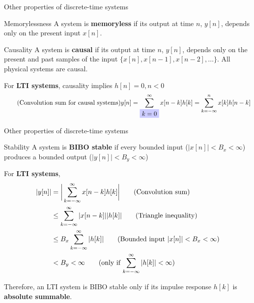 \documentclass[10pt, aspectratio=169]{beamer}
\begin{document}
\begin{frame}{Other properties of discrete-time systems}

\begin{block}{Memorylessness}
	A system is \textbf{memoryless} if its output at time $n$, $y[n]$,  depends only on the present input $x[n]$.
\end{block}

\begin{block}{Causality}
	A system is \textbf{causal} if its output at time $n$, $y[n]$, depends only on the present and past samples of the input $\{x[n], x[n-1], x[n-2], \ldots\}$. All physical systems are causal.
	\vspace{0.5cm}
	
	For \textbf{LTI systems}, causality implies $h[n] = 0, n < 0$
	\begin{equation*}\tag{Convolution sum for causal systems}
	y[n] = \sum_{\tikz[baseline]{
			\node[fill=blue!20,anchor=base] (t1) {$k=0$};}}^{\infty} x[n-k]h[k] = \sum_{k=-\infty}^{n} x[k]h[n-k]
	\end{equation*}
	
\end{block}

\end{frame}

\begin{frame}{Other properties of discrete-time systems}
	
	\begin{block}{Stability}
		A system is \textbf{BIBO stable} if every bounded input ($|x[n]| < B_x < \infty$) produces a bounded output ($|y[n]| < B_y < \infty$)

		For \textbf{LTI systems},
		\vspace{-0.25cm}
		\begin{align*}
		|y[n]| &= \bigg|\sum_{k = -\infty}^{\infty} x[n-k]h[k]\bigg| \tag{Convolution sum} \\
		&\leq \sum_{k = -\infty}^{\infty} |x[n-k]||h[k]| \tag{Triangle inequality} \\
		& \leq B_x\sum_{k = -\infty}^{\infty} |h[k]| \tag{Bounded input $|x[n]| < B_x < \infty$} \\
		& < B_y < \infty \tag{only if $\displaystyle\sum_{k=-\infty}^{\infty}|h[k]| < \infty$}
		\end{align*}
		\vspace{-0.3cm}
		 
		 Therefore, an LTI system is BIBO stable only if its impulse response $h[k]$ is \textbf{absolute summable}.
	\end{block}
\end{frame}
\end{document}
